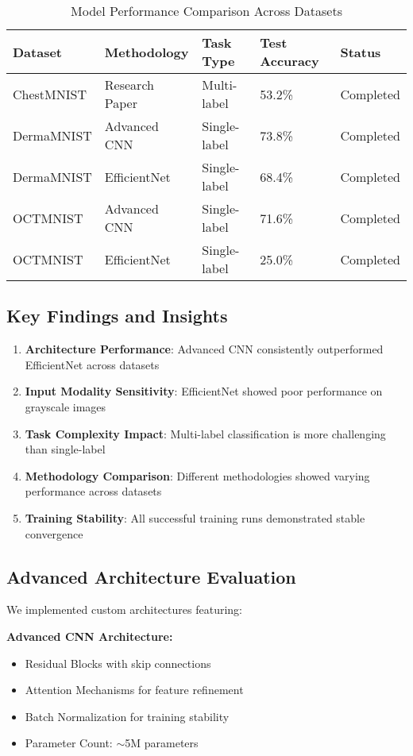 \documentclass[12pt,a4paper]{article}
\begin{document}
\begin{table}[H]
\centering
\caption{Model Performance Comparison Across Datasets}
\begin{tabular}{@{}lllll@{}}
\toprule
\textbf{Dataset} & \textbf{Methodology} & \textbf{Task Type} & \textbf{Test Accuracy} & \textbf{Status} \\ \midrule
ChestMNIST & Research Paper & Multi-label & 53.2\% & Completed \\
DermaMNIST & Advanced CNN & Single-label & 73.8\% & Completed \\
DermaMNIST & EfficientNet & Single-label & 68.4\% & Completed \\
OCTMNIST & Advanced CNN & Single-label & 71.6\% & Completed \\
OCTMNIST & EfficientNet & Single-label & 25.0\% & Completed \\ \bottomrule
\end{tabular}
\end{table}

\subsection{Key Findings and Insights}

\begin{enumerate}
    \item \textbf{Architecture Performance}: Advanced CNN consistently outperformed EfficientNet across datasets
    \item \textbf{Input Modality Sensitivity}: EfficientNet showed poor performance on grayscale images
    \item \textbf{Task Complexity Impact}: Multi-label classification is more challenging than single-label
    \item \textbf{Methodology Comparison}: Different methodologies showed varying performance across datasets
    \item \textbf{Training Stability}: All successful training runs demonstrated stable convergence
\end{enumerate}

\subsection{Advanced Architecture Evaluation}

We implemented custom architectures featuring:

\textbf{Advanced CNN Architecture:}
\begin{itemize}
    \item Residual Blocks with skip connections
    \item Attention Mechanisms for feature refinement
    \item Batch Normalization for training stability
    \item Parameter Count: $\sim$5M parameters
\end{itemize}
\end{document}
